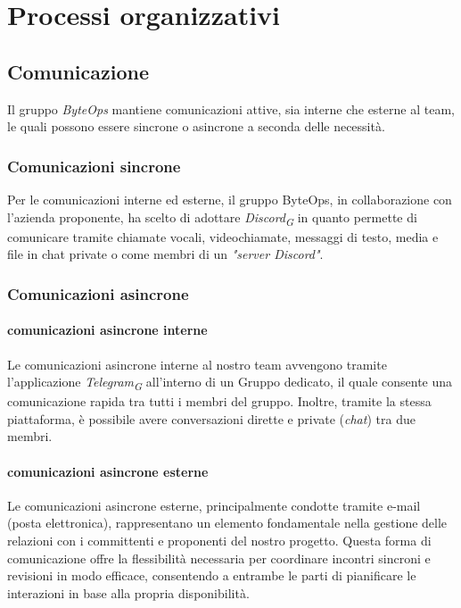 \documentclass{article}
\begin{document}



\section{Processi organizzativi}
    \subsection{Comunicazione}
    Il gruppo \textit{ByteOps} mantiene comunicazioni attive, sia interne che esterne al team, le quali possono essere sincrone o asincrone a seconda delle necessità.
    \subsubsection{Comunicazioni sincrone}
    Per le comunicazioni interne ed esterne, il gruppo ByteOps, in collaborazione con l'azienda proponente, ha scelto di adottare \textit{Discord}\textsubscript{\textit{G}} in quanto permette di comunicare tramite chiamate vocali, videochiamate, messaggi di testo, media e file in chat private o come membri di un \textit{"server Discord"}.
    \subsubsection{Comunicazioni asincrone}
        \paragraph{comunicazioni asincrone interne}
        Le comunicazioni asincrone interne al nostro team avvengono tramite l'applicazione \textit{Telegram}\textsubscript{\textit{G}} all'interno di un Gruppo dedicato, il quale consente una comunicazione rapida tra tutti i membri del gruppo. Inoltre, tramite la stessa piattaforma, è possibile avere conversazioni dirette e private (\textit{chat}) tra due membri.
        \paragraph{comunicazioni asincrone esterne}
        Le comunicazioni asincrone esterne, principalmente condotte tramite e-mail (posta elettronica), rappresentano un elemento fondamentale nella gestione delle relazioni con i committenti e proponenti del nostro progetto. Questa forma di comunicazione offre la flessibilità necessaria per coordinare incontri sincroni e revisioni in modo efficace, consentendo a entrambe le parti di pianificare le interazioni in base alla propria disponibilità. 
    
\end{document}
